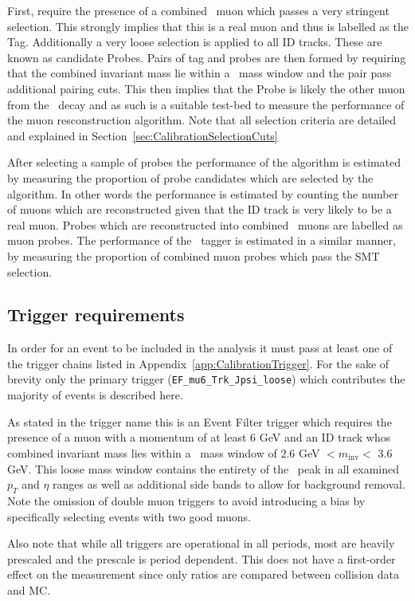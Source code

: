 First, require the presence of a combined \staco\ muon which passes a very stringent selection. This strongly implies that this is a real muon and thus is labelled as the Tag. Additionally a very loose selection is applied to all ID tracks. These are known as candidate Probes. Pairs of tag and probes are then formed by requiring that the combined invariant mass lie within a \jpsi\ mass window and the pair pass additional pairing cuts. This then implies that the Probe is likely the other muon from the \jpsi\ decay and as such is a suitable test-bed to measure the performance of the muon resconstruction algorithm. Note that all selection criteria are detailed and explained in Section~\ref{sec:CalibrationSelectionCuts}

After selecting a sample of probes the performance of the algorithm is estimated by measuring the proportion of probe candidates which are selected by the algorithm. In other words the performance is estimated by counting the number of muons which are reconstructed given that the ID track is very likely to be a real muon. Probes which are reconstructed into combined \staco\ muons are labelled as muon probes. The performance of the \xsm\ tagger is estimated in a similar manner, by measuring the proportion of combined muon probes which pass the SMT selection.

\subsection{Trigger requirements} \label{sec:CalibrationTriggerRequirement}
In order for an event to be included in the analysis it must pass at least one of the trigger chains listed in Appendix~\ref{app:CalibrationTrigger}. For the sake of brevity only the primary trigger (\verb|EF_mu6_Trk_Jpsi_loose|) which contributes the majority of events is described here.

As stated in the trigger name this is an Event Filter trigger which requires the presence of a muon with a momentum of at least 6 GeV and an ID track whos combined invariant mass lies within a \jpsi\ mass window of 2.6 GeV $<m_{\textrm{inv}}<$ 3.6 GeV. This loose mass window contains the entirety of the \jpsi\ peak in all examined $p_{T}$ and $\eta$ ranges as well as additional side bands to allow for background removal. Note the omission of double muon triggers to avoid introducing a bias by specifically selecting events with two good muons. 

Also note that while all triggers are operational in all periods, most are heavily prescaled and the prescale is period dependent. This does not have a first-order effect on the measurement since only ratios are compared between collision data and MC.


